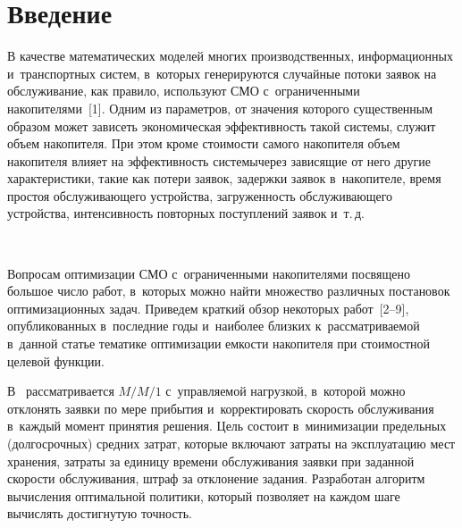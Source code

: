 \thispagestyle{headings}

\begin{multicols}{2}

\label{st\stat}

  
  \section{Введение}
  
  В качестве математических моделей многих производственных, 
информационных и~транспортных систем, в~которых генерируются случайные 
потоки заявок на обслуживание, как правило, используют СМО 
с~ограниченными накопителями~[1]. Одним из параметров, от значения 
которого существенным образом может зависеть экономическая эффективность 
такой системы, служит объем накопителя. При этом кроме стоимости самого 
накопителя объем накопителя влияет на эффективность системы\linebreak через 
зависящие от него другие характеристики, такие как потери заявок, задержки 
заявок в~на\-ко\-пи\-теле, время простоя обслуживающего устройства, 
загруженность обслуживающего устройства, интенсивность повторных 
поступлений заявок и~т.\,д.

  \begin{figure*}[b] %
\vspace*{3pt}
 \begin{center}
 \mbox{%
 \epsfxsize=117.503mm 
 }
 \end{center}
   \vspace*{-9pt}
  \end{figure*}
  
   
  Вопросам оптимизации СМО с~ограниченными накопителями посвящено 
большое число работ, в~которых можно найти множество различных 
постановок оптимизационных задач. Приведем краткий обзор некоторых 
работ~[2--9], опубликованных в~последние годы и~наиболее близких 
к~рассматриваемой в~данной статье тематике оптимизации емкости 
накопителя при стоимостной целевой функции.

 В~\cite{2-aga} рассматривается 
$M/M/1$ с~управ\-ля\-емой нагрузкой, в~которой можно отклонять заявки по мере 
прибытия и~корректировать ско\-рость обслуживания в~каждый момент 
принятия решения. Цель состоит в~минимизации предельных (долгосрочных) 
средних затрат, которые включают затраты на эксплуатацию мест хранения, 
затраты за единицу времени обслуживания заявки при заданной ско\-рости 
обслуживания, штраф за отклонение задания. Разработан алгоритм вычисления 
оптимальной политики, который позволяет на каждом шаге вычислять 
достигнутую точность. 


\end{multicols}
